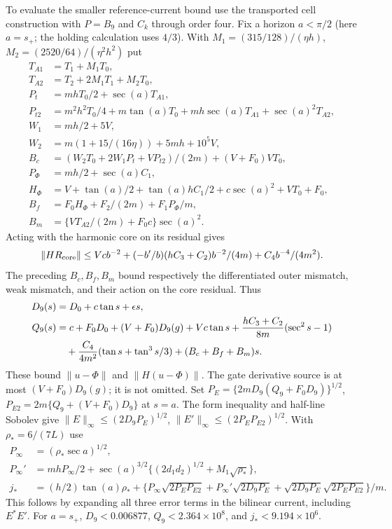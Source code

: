 \documentclass[11pt]{article}
\theoremstyle{definition}\newtheorem{definition}[theorem]{Definition}
\theoremstyle{remark}\newtheorem{remark}[theorem]{Remark}
\begin{document}
To evaluate the smaller reference-current bound use the transported
cell construction with $P=B_9$ and $C_k$ through order four. Fix a
horizon $a<\pi/2$ (here $a=s_+$; the holding calculation uses $4/3$).
With $M_1=(315/128)/(\eta h)$, $M_2=(2520/64)/(\eta^2h^2)$ put
\begin{align*}
 T_{A1}&=T_1+M_1T_0,\\
 T_{A2}&=T_2+2M_1T_1+M_2T_0,\\
 P_t&=mhT_0/2+\sec(a)T_{A1},\\
 P_{t2}&=m^2h^2T_0/4+m\tan(a)T_0
                 +mh\sec(a)T_{A1}+\sec(a)^2T_{A2},\\
 W_1&=mh/2+5V,\\
 W_2&=m(1+15/(16\eta))+5mh+10^5V,\\
 B_c&=(W_2T_0+2W_1P_t+VP_{t2})/(2m)+(V+F_0)VT_0,\\
 P_\Phi&=mh/2+\sec(a)C_1,\\
 H_\Phi&=V+\tan(a)/2+\tan(a)hC_1/2+c\sec(a)^2+VT_0+F_0,\\
 B_f&=F_0H_\Phi+F_2/(2m)+F_1P_\Phi/m,\\
 B_m&=\{VT_{A2}/(2m)+F_0c\}\sec(a)^2.
\end{align*}
Acting with the harmonic core on its residual gives
\[
 \|H R_{\rm core}\|\leq Vcb^{-2}
   +(-b'/b)(hC_3+C_2)b^{-2}/(4m)+C_4b^{-4}/(4m^2).
\]
The preceding $B_c,B_f,B_m$ bound respectively the differentiated outer
mismatch, weak mismatch, and their action on the core residual. Thus
\begin{align}
 D_9(s)&=D_0+c\tan s+\epsilon s,\notag\\
 Q_9(s)&=c+F_0D_0+(V+F_0)D_9(g)+Vc\tan s
       +\frac{hC_3+C_2}{8m}(\sec^2s-1)\notag\\
 &\quad+\frac{C_4}{4m^2}(\tan s+\tan^3s/3)
                         +(B_c+B_f+B_m)s.\label{old:DQ9}
\end{align}
These bound $\|u-\Phi\|$ and $\|H(u-\Phi)\|$. The gate derivative
source is at most $(V+F_0)D_9(g)$; it is not omitted.
Set $P_E=\{2mD_9(Q_9+F_0D_9)\}^{1/2}$,
$P_{E2}=2m\{Q_9+(V+F_0)D_9\}$ at $s=a$.
The form inequality and half-line Sobolev give
$\|E\|_\infty\leq(2D_9P_E)^{1/2}$,
$\|E'\|_\infty\leq(2P_EP_{E2})^{1/2}$.
With $\rho_*=6/(7L)$ use
\begin{align*}
 P_\infty&=(\rho_*\sec a)^{1/2},\\
 P_\infty'&=mhP_\infty/2+
   \sec(a)^{3/2}\{(2d_1d_2)^{1/2}+M_1\sqrt{\rho_*}\},\\
 j_*&=(h/2)\tan(a)\rho_*+
 \{P_\infty\sqrt{2P_EP_{E2}}+
   P_\infty'\sqrt{2D_9P_E}+
   \sqrt{2D_9P_E}\sqrt{2P_EP_{E2}}\}/m.
\end{align*}
This follows by expanding all three error terms in the bilinear current,
including $E^*E'$. For $a=s_+$, $D_9<0.006877$, $Q_9<2.364\times10^8$,
and $j_*<9.194\times10^6$.
\end{document}
